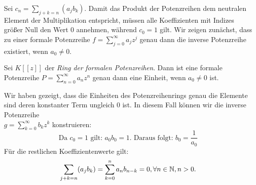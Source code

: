 %
Sei $c_n = \sum_{j+k=n} (a_j b_k)$. Damit das Produkt der Potenzreihen dem neutralen Element der Multiplikation entspricht, müssen alle Koeffizienten mit Indizes größer Null den Wert $0$ annehmen, während $c_0 =1$ gilt. 
Wir zeigen zunächst, dass zu einer formale Potenzreihe $f = \sum_{j=0}^\infty a_j z^j$ genau dann die inverse Potenzreihe existiert, wenn $a_0 \neq 0 $.
%
%
%
\begin{satz}\label{potenzreihenringEinheit}
Sei $K[[z]] $ der \textit{Ring der formalen Potenzreihen}. Dann ist eine formale Potenzreihe $P = \sum\limits_{n=0}^{\infty}a_nz^n $ genau dann eine Einheit, wenn $a_0 \neq 0$ ist.\\ 
\end{satz}
%
%
Wir haben gezeigt, dass die Einheiten des Potenzreihenrings genau die Elemente sind deren konstanter Term ungleich $0$ ist. In diesem Fall können wir die inverse Potenzreihe \\
$g = \sum_{k=0}^\infty b_k z^k$ konstruieren:\\
\vspace{0.8cm}
\[\text{Da } c_0 = 1 \text{ gilt: } a_0b_0 = 1.\text{ Daraus folgt: } b_0 = \frac{1}{a_0}\]
Für die restlichen Koeffizientenwerte gilt:
\begin{equation}
\label{eq: invers}
\sum_{j+k=n} (a_j b_k) = \sum_{k=0}^{n} a_nb_{n-k} = 0, \forall n \in \mathbb{N}, n > 0.
\end{equation}
